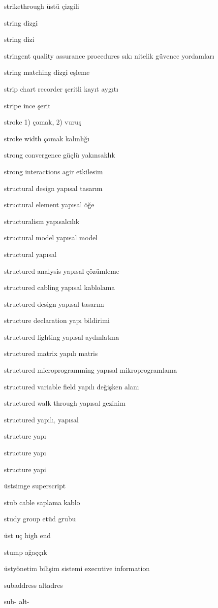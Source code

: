 \documentclass[12pt,fleqn]{article}\usepackage{../../common}
\begin{document}
strikethrough üstü çizgili

string dizgi

string dizi

stringent quality assurance procedures sıkı nitelik güvence yordamları

string matching dizgi eşleme

strip chart recorder şeritli kayıt aygıtı

stripe ince şerit

stroke 1) çomak, 2) vuruş

stroke width çomak kalınlığı

strong convergence güçlü yakınsaklık

strong interactions agir etkilesim

structural design yapısal tasarım

structural element yapısal öğe

structuralism yapısalcılık

structural model yapısal model

structural yapısal

structured analysis yapısal çözümleme

structured cabling yapısal kablolama

structured design yapısal tasarım

structure declaration yapı bildirimi

structured lighting yapısal aydınlatma

structured matrix yapılı matris

structured microprogramming yapısal mikroprogramlama

structured variable field yapılı değişken alanı

structured walk through yapısal gezinim

structured yapılı, yapısal

structure yapı

structure yapı

structure yapi

üstsimge superscript

stub cable saplama kablo

study group etüd grubu

üst uç high end

stump ağaççık

üstyönetim bilişim sistemi executive information

subaddress altadres

sub- alt-
\end{document}
